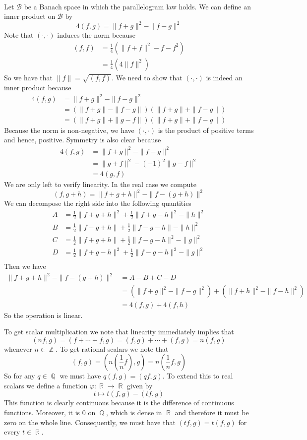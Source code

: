 \documentclass{article}
\DeclareMathOperator{\Z}{\mathbb{Z}}
\DeclareMathOperator{\Q}{\mathbb{Q}}
\DeclareMathOperator{\R}{\mathbb{R}}
\newcommand{\problem}[1]{\noindent{\textbf{Problem #1}}\\}
\newcommand{\norm}[1]{\|#1\|}
\begin{document}
\problem{1.8.25} Let $\mathcal{B}$ be a Banach space in which the parallelogram law holds. We can define an inner product on $\mathcal{B}$ by
\[
4(f,g) = \norm{f+g}^2 - \norm{f-g}^2
\]
Note that $(\cdot, \cdot)$ induces the norm because
\begin{align*}
(f,f) &= \frac{1}{4}\left(\norm{f+f}^2 - {f-f}^2\right) \\
&= \frac{1}{4}(4\norm{f}^2) 
\end{align*}
So we have that $\norm{f} = \sqrt{(f,f)}$. We need to show that $(\cdot, \cdot)$ is indeed an inner product because 
\begin{align*}
4(f,g) &= \norm{f+g}^2 - \norm{f-g}^2 \\
&= (\norm{f+g} - \norm{f-g})(\norm{f+g} + \norm{f-g}) \\
&= (\norm{f+g} + \norm{g-f})(\norm{f+g} + \norm{f-g}) 
\end{align*}
Because the norm is non-negative, we have $(\cdot, \cdot)$ is the product of positive terms and hence, positive. Symmetry is also clear because 
\begin{align*}
4(f,g) &= \norm{f+g}^2 - \norm{f-g}^2 \\
&= \norm{g+f}^2 - (-1)^2\norm{g-f}^2 \\
&= 4(g,f)
\end{align*}
We are only left to verify linearity. In the real case we compute
\[
(f, g+h) = \norm{f+g+h}^2 - \norm{f - (g+h)}^2
\]
We can decompose the right side into the following quantities
\begin{align*}
A &= \frac{1}{2}\norm{f+g+h}^2 + \frac{1}{2}\norm{f+g-h}^2 - \norm{h}^2 \\
B &= \frac{1}{2}\norm{f-g+h} + \frac{1}{2}\norm{f-g-h} - \norm{h}^2 \\
C &= \frac{1}{2}\norm{f+g+h} + \frac{1}{2}\norm{f-g-h}^2 - \norm{g}^2 \\
D &= \frac{1}{2}\norm{f+g-h}^2 + \frac{1}{2}\norm{f-g-h}^2 - \norm{g}^2 \\
\end{align*}
Then we have
\begin{align*}
\norm{f+g+h}^2 - \norm{f-(g+h)}^2 &= A - B + C - D \\
&= \left(\norm{f+g}^2 - \norm{f-g}^2\right) + \left(\norm{f+h}^2 - \norm{f-h}^2\right) \\
&= 4(f,g) + 4(f,h)
\end{align*}
So the operation is linear. 

To get scalar multiplication we note that linearity immediately implies that
\[
(nf,g) = (f + \cdots + f,g) = (f,g) + \cdots + (f,g) = n(f,g)
\]
whenever $n \in \Z$. To get rational scalars we note that 
\[
(f,g) = (n(\frac{1}{n}f), g) = n(\frac{1}{n}f, g)
\]
So for any $q \in \Q$ we must have $q(f,g) = (qf, g)$. To extend this to real scalars we define a function $\varphi: \R \to \R$ given by 
\[
t \mapsto t(f,g) - (tf, g)
\]
This function is clearly continuous because it is the difference of continuous functions. Moreover, it is $0$ on $\Q$, which is dense in $\R$ and therefore it must be zero on the whole line. Consequently, we must have that $(tf, g) = t(f,g)$ for every $t \in \R$. 
\end{document}
